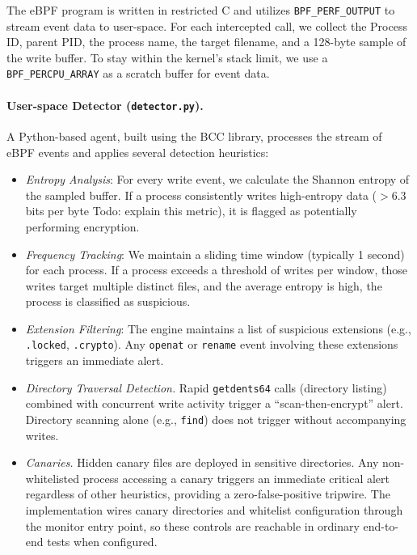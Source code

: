\documentclass[twocolumn, 10pt]{scrartcl}
\newcommand{\todo}[1]{{\color{red} Todo: #1}}
\begin{document}
The eBPF program is written in restricted C and utilizes \texttt{BPF\_PERF\_OUTPUT} to stream event data to user-space. For each intercepted call, we collect the Process ID, parent PID, the process name, the target filename, and a 128-byte sample of the write buffer. To stay within the kernel's stack limit, we use a \texttt{BPF\_PERCPU\_ARRAY} as a scratch buffer for event data.

\paragraph{User-space Detector (\texttt{detector.py}).}
A Python-based agent, built using the BCC library, processes the stream of eBPF events and applies several detection heuristics:
\begin{itemize}
    \item \textit{Entropy Analysis}: For every write event, we calculate the Shannon entropy of the sampled buffer. If a process consistently writes high-entropy data ($> 6.3$ bits per byte \todo{explain this metric}), it is flagged as potentially performing encryption.
    
    \item \textit{Frequency Tracking}: We maintain a sliding time window (typically 1 second) for each process. If a process exceeds a threshold of writes per window, those writes target multiple distinct files, and the average entropy is high, the process is classified as suspicious.
    
    \item \textit{Extension Filtering}: The engine maintains a list of suspicious extensions (e.g., \texttt{.locked}, \texttt{.crypto}). Any \texttt{openat} or \texttt{rename} event involving these extensions triggers an immediate alert.
    
    \item \textit{Directory Traversal Detection.}
    Rapid \texttt{getdents64} calls (directory listing) combined with concurrent write activity trigger a ``scan-then-encrypt'' alert. Directory scanning alone (e.g., \texttt{find}) does not trigger without accompanying writes.
    
    \item \textit{Canaries.}
    Hidden canary files are deployed in sensitive directories. Any non-whitelisted process accessing a canary triggers an immediate critical alert regardless of other heuristics, providing a zero-false-positive tripwire. The implementation wires canary directories and whitelist configuration through the monitor entry point, so these controls are reachable in ordinary end-to-end tests when configured.
\end{itemize}
\end{document}
